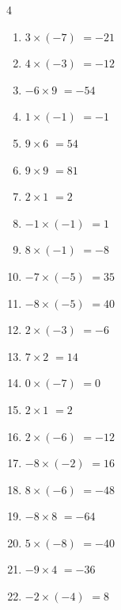 \begin{multicols}{4}
\begin{enumerate}
  \item $3\times (-7)$
        $=-21$

  \item $4\times (-3)$
        $=-12$

  \item $-6\times 9$
        $=-54$

  \item $1\times (-1)$
        $=-1$

  \item $9\times 6$
        $=54$

  \item $9\times 9$
        $=81$

  \item $2\times 1$
        $=2$

  \item $-1\times (-1)$
        $=1$

  \item $8\times (-1)$
        $=-8$

  \item $-7\times (-5)$
        $=35$

  \item $-8\times (-5)$
        $=40$

  \item $2\times (-3)$
        $=-6$

  \item $7\times 2$
        $=14$

  \item $0\times (-7)$
        $=0$

  \item $2\times 1$
        $=2$

  \item $2\times (-6)$
        $=-12$

  \item $-8\times (-2)$
        $=16$

  \item $8\times (-6)$
        $=-48$

  \item $-8\times 8$
        $=-64$

\columnbreak %

  \item $5\times (-8)$
        $=-40$

  \item $-9\times 4$
        $=-36$

  \item $-2\times (-4)$
        $=8$


\end{enumerate}
\end{multicols}
